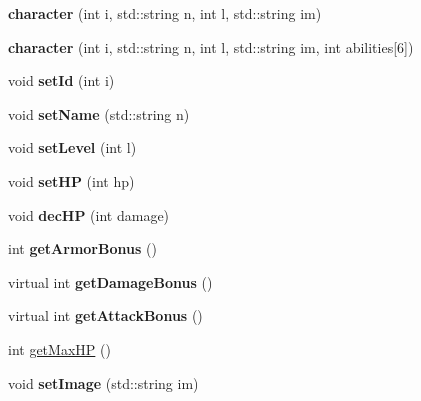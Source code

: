 \begin{DoxyCompactItemize}
\item 
\hypertarget{classcharacter_a7f19c0ee3b827b017eff3ad6fae5c422}{}\label{classcharacter_a7f19c0ee3b827b017eff3ad6fae5c422} 
{\bfseries character} (int i, std\+::string n, int l, std\+::string im)
\item 
\hypertarget{classcharacter_adeb8d2beadcc402ce388606cdaa0bba6}{}\label{classcharacter_adeb8d2beadcc402ce388606cdaa0bba6} 
{\bfseries character} (int i, std\+::string n, int l, std\+::string im, int abilities\mbox{[}6\mbox{]})
\item 
\hypertarget{classcharacter_a8dcd236fcff892e4515e859318072551}{}\label{classcharacter_a8dcd236fcff892e4515e859318072551} 
void {\bfseries set\+Id} (int i)
\item 
\hypertarget{classcharacter_ae9dffcbabcac5371a92f442a08b497fd}{}\label{classcharacter_ae9dffcbabcac5371a92f442a08b497fd} 
void {\bfseries set\+Name} (std\+::string n)
\item 
\hypertarget{classcharacter_a1debcb88c0662f8b361122b4261d777c}{}\label{classcharacter_a1debcb88c0662f8b361122b4261d777c} 
void {\bfseries set\+Level} (int l)
\item 
\hypertarget{classcharacter_a528b7881f18a272cd71bb4f442c5ad80}{}\label{classcharacter_a528b7881f18a272cd71bb4f442c5ad80} 
void {\bfseries set\+HP} (int hp)
\item 
\hypertarget{classcharacter_ae25486dd054cd4c9202111b616794a8e}{}\label{classcharacter_ae25486dd054cd4c9202111b616794a8e} 
void {\bfseries dec\+HP} (int damage)
\item 
\hypertarget{classcharacter_a342bf66b25c7f8e5b006ed88a85c7183}{}\label{classcharacter_a342bf66b25c7f8e5b006ed88a85c7183} 
int {\bfseries get\+Armor\+Bonus} ()
\item 
\hypertarget{classcharacter_aa9641ce584c23e39fa9a085afa1b8d5b}{}\label{classcharacter_aa9641ce584c23e39fa9a085afa1b8d5b} 
virtual int {\bfseries get\+Damage\+Bonus} ()
\item 
\hypertarget{classcharacter_a926466b75c8655ca69385780ad3f1a0b}{}\label{classcharacter_a926466b75c8655ca69385780ad3f1a0b} 
virtual int {\bfseries get\+Attack\+Bonus} ()
\item 
int \hyperlink{classcharacter_a7545a786510f968f6299e8975e6b6b06}{get\+Max\+HP} ()
\item 
\hypertarget{classcharacter_aae5fa02f62b32f9daa389d8d68d5b4d6}{}\label{classcharacter_aae5fa02f62b32f9daa389d8d68d5b4d6} 
void {\bfseries set\+Image} (std\+::string im)
\item 

\end{DoxyCompactItemize}
